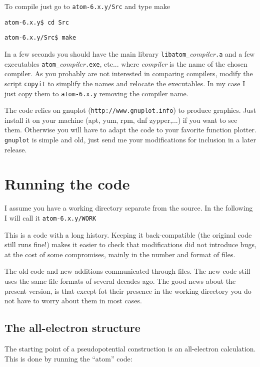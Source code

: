 \documentclass[11pt]{article}
\begin{document}
To compile just go to \texttt{atom-6.x.y/Src} and type make

\noindent\texttt{atom-6.x.y\$ cd Src}

\noindent\texttt{atom-6.x.y/Src\$ make}

In a few seconds you should have the main library \texttt{libatom{\_}}\textit{compiler}\texttt{.a} 
and a few executables \texttt{atom{\_}}\textit{compiler}\texttt{.exe}, etc... 
where \textit{compiler} is the name of the chosen compiler. 
As you probably are not interested in comparing compilers, modify
the script \texttt{copyit} to simplify the names and relocate the executables.  In my case
I just copy them to \texttt{atom-6.x.y} removing the compiler name.

The code relies on gnuplot (\texttt{http://www.gnuplot.info}) to produce graphics.  Just install it
on your machine (apt, yum, rpm, dnf zypper,...) if you want to see them.  Otherwise you will
have to adapt the code to your favorite function plotter.  \texttt{gnuplot} is simple and old,
just send me your modifications for inclusion in a later release.




\section{Running the code}
\label{sec:run}

I assume you have a working directory separate from the source.  In the following I will call it
\texttt{atom-6.x.y/WORK}

This is a code with a long history.  Keeping it back-compatible (the original code still runs fine!)
makes it easier to check that modifications did not introduce bugs, at the cost of some compromises,
mainly in the number and format of files.

The old code and new additions communicated through files.  The new code still uses the same file formats
of several decades ago.
The good news about the present version, is that except fot their presence in the working directory
you do not have to worry about them in most cases.


\subsection{The all-electron structure}
\label{sec:run-ae}

The starting point of a pseudopotential construction is an all-electron calculation.
This is done by running the ``atom'' code:
\end{document}
